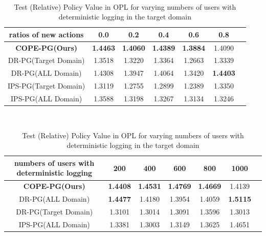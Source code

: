 \begin{table}[h]
\begin{minipage}{\textwidth}
    \label{table:ope-deterministic-logging}
    \vspace{-2pt}
\end{minipage} \\
\begin{minipage}{\textwidth}
    \centering
    \caption{Test (Relative) Policy Value in OPL for varying ratios of new actions in the target domain} \vspace{1mm}
    \begin{tabular}{c|cccccc}
        \toprule
        ratios of new actions & 0.0   & 0.2    & 0.4    & 0.6    & 0.8  \\ 
        \midrule\midrule
        \textbf{COPE-PG(Ours)}      & \textbf{1.4463} & \textbf{1.4060} & \textbf{1.4389} & \textbf{1.3884} & 1.4090 \\
        DR-PG(Target Domain)        & 1.3518 & 1.3220 & 1.3364 & 1.2663 & 1.3339 \\
        DR-PG(ALL Domain)    & 1.4308 & 1.3947 & 1.4064 & 1.3420 & \textbf{1.4403} \\
        IPS-PG(Target Domain)        & 1.3119 & 1.2755 & 1.2899 & 1.2389 & 1.3350 \\
        IPS-PG(ALL Domain)   & 1.3588 & 1.3198 & 1.3267 & 1.3134 & 1.3246 \\
        \bottomrule
    \end{tabular}
    \label{table:opl-new-actions}
    \vspace{-2pt}
\end{minipage} \\
\begin{minipage}{\textwidth}
    \centering
    \caption{Test (Relative) Policy Value in OPL for varying numbers of users with deterministic logging in the target domain} \vspace{1mm}
    \begin{tabular}{c|cccccc} 
        \toprule
        numbers of users with deterministic logging    & 200    & 400    & 600    & 800    & 1000 \\
        \midrule\midrule
        \textbf{COPE-PG(Ours)}      & \textbf{1.4408} & \textbf{1.4531} & \textbf{1.4769} & \textbf{1.4669} & 1.4139 \\
        DR-PG(ALL Domain)   & \textbf{1.4477} & 1.4180 & 1.3954 & 1.4059 & \textbf{1.5115}  \\
        DR-PG(Target Domain)     & 1.3101 & 1.3014 & 1.3091 & 1.3596 & 1.3013 \\
        IPS-PG(ALL Domain)  & 1.3381 & 1.3003 & 1.3149 & 1.3625 & 1.4651 \\

\end{tabular}
\end{minipage}
\end{table}
